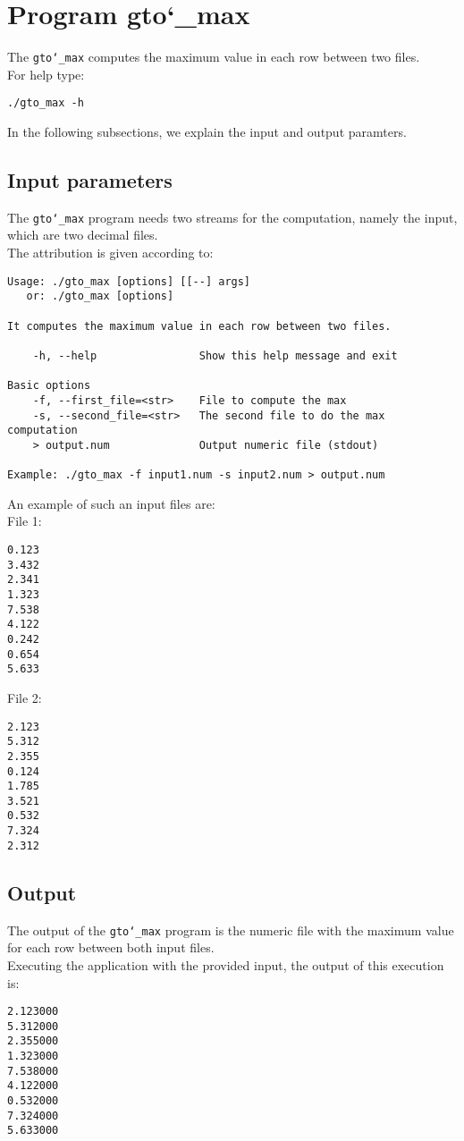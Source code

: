 \section{Program gto\char`_max}
The \texttt{gto\char`_max} computes the maximum value in each row between two files.\\
For help type:
\begin{lstlisting}
./gto_max -h
\end{lstlisting}
In the following subsections, we explain the input and output paramters.

\subsection*{Input parameters}

The \texttt{gto\char`_max} program needs two streams for the computation, namely the input, which are two decimal files.\\
The attribution is given according to:
\begin{lstlisting}
Usage: ./gto_max [options] [[--] args]
   or: ./gto_max [options]

It computes the maximum value in each row between two files.

    -h, --help                Show this help message and exit

Basic options
    -f, --first_file=<str>    File to compute the max
    -s, --second_file=<str>   The second file to do the max computation
    > output.num              Output numeric file (stdout)

Example: ./gto_max -f input1.num -s input2.num > output.num
\end{lstlisting}
An example of such an input files are:\\
File 1:
\begin{lstlisting}
0.123
3.432
2.341
1.323
7.538
4.122
0.242
0.654
5.633
\end{lstlisting}
File 2:
\begin{lstlisting}
2.123
5.312
2.355
0.124
1.785
3.521
0.532
7.324
2.312
\end{lstlisting}

\subsection*{Output}
The output of the \texttt{gto\char`_max} program is the numeric file with the maximum value for each row between both input files.\\
Executing the application with the provided input, the output of this execution is:
\begin{lstlisting}
2.123000
5.312000
2.355000
1.323000
7.538000
4.122000
0.532000
7.324000
5.633000
\end{lstlisting}